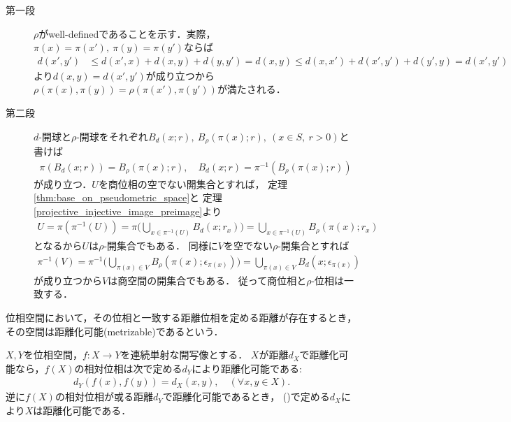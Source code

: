 	\begin{prf}\mbox{}
		\begin{description}
			\item[第一段] $\rho$がwell-definedであることを示す．実際，
				$\pi(x) = \pi(x'),\ \pi(y) = \pi(y')$ならば
				\begin{align}
					d(x',y') &\leq d(x',x) + d(x,y) + d(y,y') = d(x,y)
					\leq d(x,x') + d(x',y') + d(y',y) = d(x',y')
				\end{align}
				より$d(x,y) = d(x',y')$が成り立つから
				$\rho(\pi(x),\pi(y)) = \rho(\pi(x'),\pi(y'))$が満たされる．
				
			\item[第二段] $d$-開球と$\rho$-開球をそれぞれ$B_d(x;r),\ B_\rho(\pi(x);r),
				\ (x \in S,\ r>0)$と書けば
				\begin{align}
					\pi\left(B_d(x;r)\right) = B_\rho(\pi(x);r),
					\quad B_d(x;r) = \pi^{-1}\left(B_\rho(\pi(x);r)\right)
				\end{align}
				が成り立つ．$U$を商位相の空でない開集合とすれば，
				定理\ref{thm:base_on_pseudometric_space}と
				定理\ref{projective_injective_image_preimage}より
				\begin{align}
					U = \pi\left(\pi^{-1}(U)\right)
					= \pi\Biggl(\bigcup_{x \in \pi^{-1}(U)}B_d(x;r_x)\Biggr)
					= \bigcup_{x \in \pi^{-1}(U)} B_\rho(\pi(x);r_x)
				\end{align}
				となるから$U$は$\rho$-開集合でもある．
				同様に$V$を空でない$\rho$-開集合とすれば
				\begin{align}
					\pi^{-1}(V)
					= \pi^{-1}\Biggl(\bigcup_{\pi(x) \in V} B_\rho\left(\pi(x);\epsilon_{\pi(x)}\right)\Biggr)
					= \bigcup_{\pi(x) \in V} B_d\left(x;\epsilon_{\pi(x)}\right)
				\end{align}
				が成り立つから$V$は商空間の開集合でもある．
				従って商位相と$\rho$-位相は一致する．
				\QED
		\end{description}
	\end{prf}
	
	\begin{screen}
		\begin{dfn}[距離化可能]
			位相空間において，その位相と一致する距離位相を定める距離が存在するとき，
			その空間は距離化可能(metrizable)であるという．
		\end{dfn}
	\end{screen}
	
	\begin{screen}
		\begin{thm}[連続単射な開写像による距離化可能性の遺伝]\label{thm:heredity_of_metrizability}
			$X,Y$を位相空間，$f:X \longrightarrow Y$を連続単射な開写像とする．
			$X$が距離$d_X$で距離化可能なら，$f(X)$の相対位相は次で定める$d_Y$により距離化可能である:
			\begin{align}
				d_Y\left(f(x),f(y)\right) = d_X(x,y),
				\quad (\forall x,y \in X).
				\label{eq:thm_heredity_of_metrizability}
			\end{align}
			逆に$f(X)$の相対位相が或る距離$d_Y$で距離化可能であるとき，
			()で定める$d_X$により$X$は距離化可能である．
		\end{thm}
	\end{screen}
	
